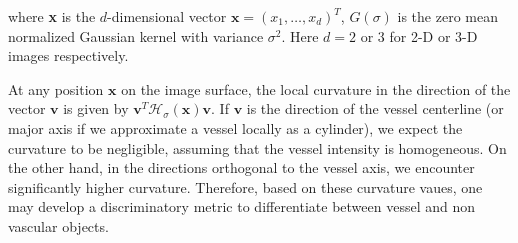 where \textbf{x} is the $d$-dimensional vector $\textbf{x}=\left(x_1,\ldots, x_d \right)^T$, $G(\sigma)$ is the zero mean normalized Gaussian kernel with variance $\sigma^2$. Here $d=2 $ or 3 for 2-D or 3-D images respectively.

At any position $\textbf{x}$ on the image surface, the local curvature in the direction of the vector $\textbf{v}$ is given by $\textbf{v}^T\mathcal{H}_\sigma(\textbf{x})\textbf{v}$. If $\textbf{v}$ is the direction of the vessel centerline (or major axis if we approximate a vessel locally as a cylinder), we expect the curvature to be negligible, assuming that the vessel intensity is homogeneous. On the other hand, in the directions orthogonal to the vessel axis, we encounter significantly higher curvature. Therefore, based on these curvature vaues, one may develop a discriminatory metric to differentiate between vessel and non vascular objects.

